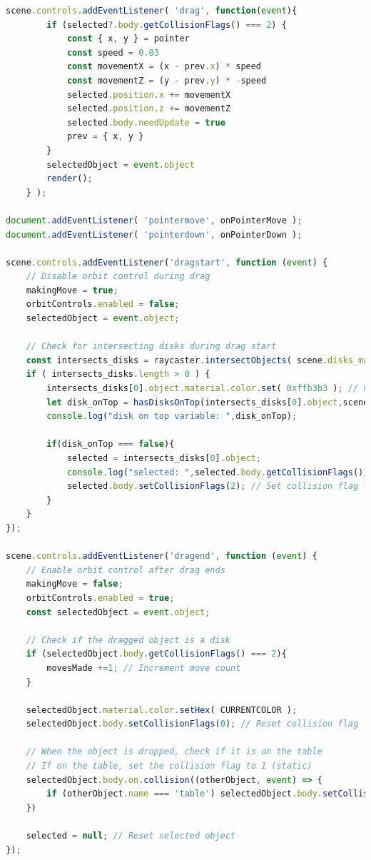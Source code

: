 \documentclass{article}
\begin{document}
\begin{lstlisting}[language=JavaScript, caption={Drag-and-Drop Interaction}]
    scene.controls.addEventListener( 'drag', function(event){
        if (selected?.body.getCollisionFlags() === 2) {
            const { x, y } = pointer
            const speed = 0.03
            const movementX = (x - prev.x) * speed
            const movementZ = (y - prev.y) * -speed
            selected.position.x += movementX
            selected.position.z += movementZ
            selected.body.needUpdate = true
            prev = { x, y }
        }
        selectedObject = event.object
        render();
    } );

document.addEventListener( 'pointermove', onPointerMove );
document.addEventListener( 'pointerdown', onPointerDown );

scene.controls.addEventListener('dragstart', function (event) {
    // Disable orbit control during drag
    makingMove = true;
    orbitControls.enabled = false;
    selectedObject = event.object;

    // Check for intersecting disks during drag start
    const intersects_disks = raycaster.intersectObjects( scene.disks_mashes, true );
    if ( intersects_disks.length > 0 ) {
        intersects_disks[0].object.material.color.set( 0xffb3b3 ); // Change color of selected object
        let disk_onTop = hasDisksOnTop(intersects_disks[0].object,scene.disks_mashes);
        console.log("disk on top variable: ",disk_onTop);

        if(disk_onTop === false){
            selected = intersects_disks[0].object;
            console.log("selected: ",selected.body.getCollisionFlags());
            selected.body.setCollisionFlags(2); // Set collision flag for the dragged disk
        }
    }
});

scene.controls.addEventListener('dragend', function (event) {
    // Enable orbit control after drag ends
    makingMove = false;
    orbitControls.enabled = true;
    const selectedObject = event.object;

    // Check if the dragged object is a disk
    if (selectedObject.body.getCollisionFlags() === 2){
        movesMade +=1; // Increment move count
    }

    selectedObject.material.color.setHex( CURRENTCOLOR );
    selectedObject.body.setCollisionFlags(0); // Reset collision flag

    // When the object is dropped, check if it is on the table
    // If on the table, set the collision flag to 1 (static)
    selectedObject.body.on.collision((otherObject, event) => {
        if (otherObject.name === 'table') selectedObject.body.setCollisionFlags(1);
    })

    selected = null; // Reset selected object
});
\end{lstlisting}
\end{document}
